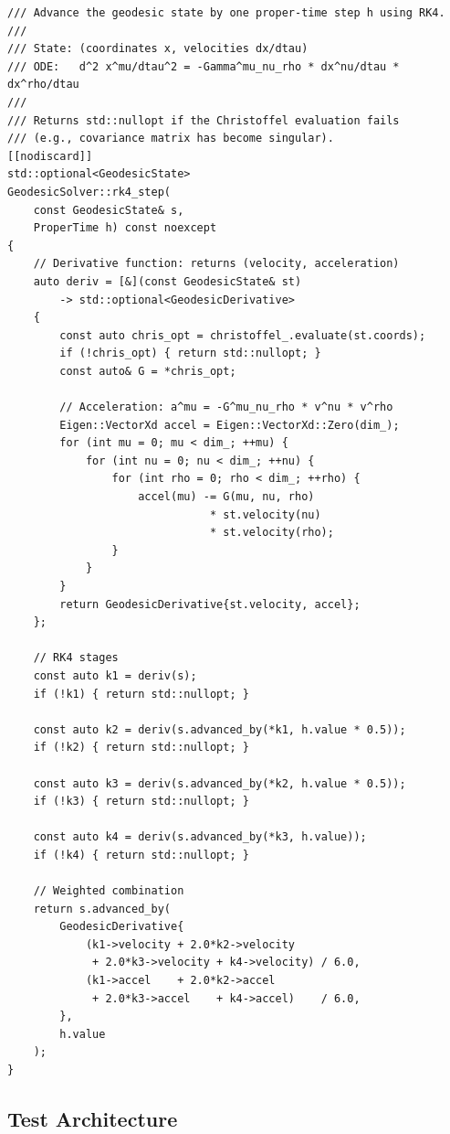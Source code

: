 \begin{lstlisting}[style=cpp20, caption={RK4 integration of the geodesic ODE.}]
/// Advance the geodesic state by one proper-time step h using RK4.
///
/// State: (coordinates x, velocities dx/dtau)
/// ODE:   d^2 x^mu/dtau^2 = -Gamma^mu_nu_rho * dx^nu/dtau * dx^rho/dtau
///
/// Returns std::nullopt if the Christoffel evaluation fails
/// (e.g., covariance matrix has become singular).
[[nodiscard]]
std::optional<GeodesicState>
GeodesicSolver::rk4_step(
    const GeodesicState& s,
    ProperTime h) const noexcept
{
    // Derivative function: returns (velocity, acceleration)
    auto deriv = [&](const GeodesicState& st)
        -> std::optional<GeodesicDerivative>
    {
        const auto chris_opt = christoffel_.evaluate(st.coords);
        if (!chris_opt) { return std::nullopt; }
        const auto& G = *chris_opt;

        // Acceleration: a^mu = -G^mu_nu_rho * v^nu * v^rho
        Eigen::VectorXd accel = Eigen::VectorXd::Zero(dim_);
        for (int mu = 0; mu < dim_; ++mu) {
            for (int nu = 0; nu < dim_; ++nu) {
                for (int rho = 0; rho < dim_; ++rho) {
                    accel(mu) -= G(mu, nu, rho)
                               * st.velocity(nu)
                               * st.velocity(rho);
                }
            }
        }
        return GeodesicDerivative{st.velocity, accel};
    };

    // RK4 stages
    const auto k1 = deriv(s);
    if (!k1) { return std::nullopt; }

    const auto k2 = deriv(s.advanced_by(*k1, h.value * 0.5));
    if (!k2) { return std::nullopt; }

    const auto k3 = deriv(s.advanced_by(*k2, h.value * 0.5));
    if (!k3) { return std::nullopt; }

    const auto k4 = deriv(s.advanced_by(*k3, h.value));
    if (!k4) { return std::nullopt; }

    // Weighted combination
    return s.advanced_by(
        GeodesicDerivative{
            (k1->velocity + 2.0*k2->velocity
             + 2.0*k3->velocity + k4->velocity) / 6.0,
            (k1->accel    + 2.0*k2->accel
             + 2.0*k3->accel    + k4->accel)    / 6.0,
        },
        h.value
    );
}
\end{lstlisting}

\subsection{Test Architecture}

